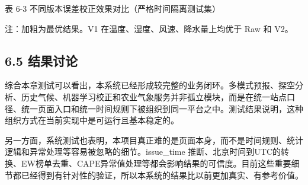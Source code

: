 表 6-3  不同版本误差校正效果对比（严格时间隔离测试集）

注：加粗为最优结果。V1 在温度、湿度、风速、降水量上均优于 Raw 和 V2。

\subsection{6.5 结果讨论}

综合本章测试可以看出，本系统已经形成较完整的业务闭环。多模式预报、探空分析、历史气候、机器学习校正和农业气象服务并非孤立模块，而是在统一站点口径、统一页面入口和统一时间规则下被组织到同一平台之中。测试结果说明，这种组织方式在当前实现中是可运行且基本稳定的。

另一方面，系统测试也表明，本项目真正难的是页面本身，而不是时间规则、统计逻辑和异常处理等容易被忽略的细节。issue\_time 推断、北京时间到UTC的转换、EW榜单去重、CAPE异常值处理等都会影响结果的可信度。目前这些重要细节都已经得到有针对性的验证，所以本系统的结果比以前更加真实、有参考价值。

